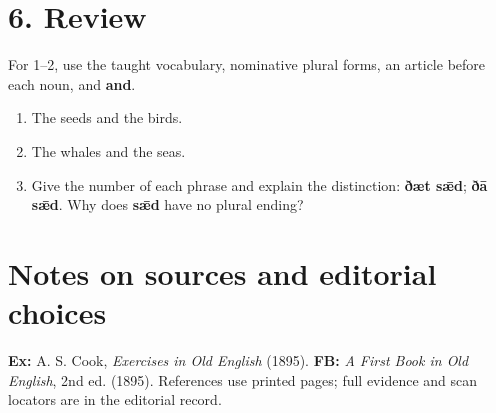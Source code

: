 \section*{6. Review}


For 1–2, use the taught vocabulary, nominative plural forms, an article before each noun, and \textbf{and}.


\begin{enumerate}
\item[1.] The seeds and the birds.
\item[2.] The whales and the seas.
\item[3.] Give the number of each phrase and explain the distinction: \textbf{ðæt sǣd}; \textbf{ðā sǣd}. Why does \textbf{sǣd} have no plural ending?
\end{enumerate}


\clearpage
\begingroup\small
{}
\section*{Notes on sources and editorial choices}


\textbf{Ex:} A. S. Cook, \emph{Exercises in Old English} (1895). \textbf{FB:} \emph{A First Book in Old English}, 2nd ed. (1895). References use printed pages; full evidence and scan locators are in the editorial record.


